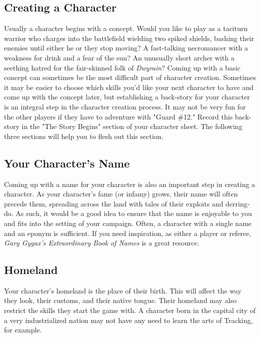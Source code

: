 \documentclass[oneside]{book}
\begin{document}
 \newpage
\begin{multicols}{2}
\section{Creating a Character}
Usually a character begins with a concept. Would you like to play as a taciturn warrior who charges into the battlefield wielding two spiked shields, bashing their enemies until either he or they stop moving? A fast-talking necromancer with a weakness for drink and a fear of the sun? An unusually short archer with a seething hatred for the fair-skinned folk of \emph{Dwyrain}?  Coming up with a basic concept can sometimes be the most difficult part of character creation. Sometimes it may be easier to choose which skills you'd like your next character to have and come up with the concept later, but establishing a back-story for your character is an integral step in the character creation process. It may not be very fun for the other players if they have to adventure with "Guard \#12." Record this back-story in the "The Story Begins" section of your character sheet. The following three sections will help you to flesh out this section.

\subsection{Your Character's Name}
Coming up with a name for your character is also an important step in creating a character. As your character's fame (or infamy) grows, their name will often precede them, spreading across the land with tales of their exploits and derring-do. As such, it would be a good idea to ensure that the name is enjoyable to you and fits into the setting of your campaign. Often, a character with a single name and an eponym is sufficient. If you need inspiration, as either a player or referee, \emph{Gary Gygax's Extraordinary Book of Names} is a great resource.

\subsection{Homeland}
Your character's homeland is the place of their birth. This will affect the way they look, their customs, and their native tongue. Their homeland may also restrict the skills they start the game with. A character born in the capital city of a very industrialized nation may not have any need to learn the arts of Tracking, for example. 


\end{multicols}
\end{document}
